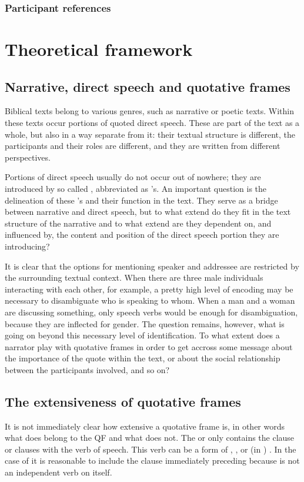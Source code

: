 \documentclass[twoside,a4paper,10pt]{article}
\newcommand{\hebr}[1]{\cjRL{#1}}
\begin{document}
\subsubsection{Participant references}

\section{Theoretical framework}
\subsection{Narrative, direct speech and quotative frames}
Biblical texts belong to various genres, such as narrative or poetic texts. Within these texts occur portions of quoted direct speech. These are part of the text as a whole, but also in a way separate from it: their textual structure is different, the participants and their roles are different, and they are written from different perspectives.

Portions of direct speech usually do not occur out of nowhere; they are introduced by so called , abbreviated as 's. An important question is the delineation of these 's and their function in the text. They serve as a bridge between narrative and direct speech, but to what extend do they fit in the text structure of the narrative and to what extend are they dependent on, and influenced by, the content and position of the direct speech portion they are introducing?

It is clear that the options for mentioning speaker and addressee are restricted by the surrounding textual context. When there are three male individuals interacting with each other, for example, a pretty high level of encoding may be necessary to disambiguate who is speaking to whom. When a man and a woman are discussing something, only speech verbs would be enough for disambiguation, because they are inflected for gender. The question remains, however, what is going on beyond this necessary level of identification. To what extent does a narrator play with quotative frames in order to get accross some message about the importance of the quote within the text, or about the social relationship between the participants involved, and so on?

\subsection{The extensiveness of quotative frames}
It is not immediately clear how extensive a quotative frame is, in other words what does belong to the QF and what does not. The  or  only contains the clause or clauses with the verb of speech. This verb can be a form of \hebr{>MR}, \hebr{DBR}, or (in ) \hebr{MLL}. In the case of \hebr{L>MR} it is reasonable to include the clause immediately preceding \hebr{L>MR} because \hebr{L>MR} is not an independent verb on itself.
\end{document}
